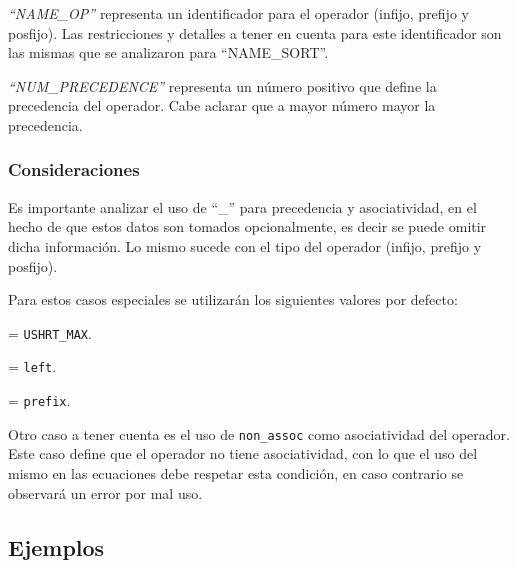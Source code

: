 \textit{``NAME\_OP''} representa un identificador para el operador (infijo, prefijo y posfijo). Las restricciones y detalles a tener en cuenta para este identificador son las mismas que se analizaron para ``NAME\_SORT''.

\textit{``NUM\_PRECEDENCE''} representa un número positivo que define la precedencia del operador. Cabe aclarar que a mayor número mayor la precedencia.

\subsubsection*{Consideraciones}
\label{subsubsec:operconsi}

Es importante analizar el uso de ``\_'' para precedencia y asociatividad, en el hecho de que estos datos son tomados opcionalmente, es decir se puede omitir dicha información. Lo mismo sucede con el tipo del operador (infijo, prefijo y posfijo). 

Para estos casos especiales se utilizarán los siguientes valores por defecto:

\begin{description}
\label{desc:default}
\item [Precedencia] = \texttt{USHRT\_MAX}.

\item [Asociatividad] = \texttt{left}.

\item [Tipo de operador] = \texttt{prefix}.
\end{description}

Otro caso a tener cuenta es el uso de \texttt{non\_assoc} como asociatividad del operador. Este caso define que el operador no tiene asociatividad, con lo que el uso del mismo en las ecuaciones debe respetar esta condición, en caso contrario se observará un error por mal uso.

\subsection*{Ejemplos}

